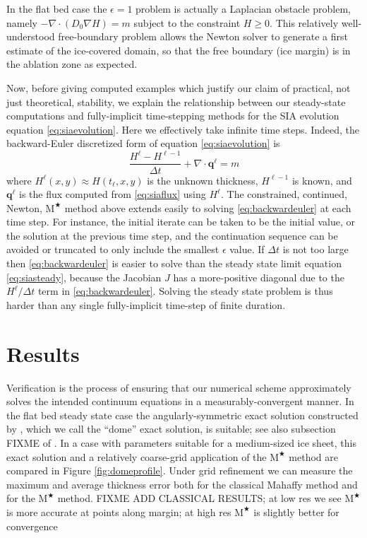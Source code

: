 \documentclass[twocolumn,letterpaper]{igs}
\newcommand\bq{\mathbf{q}}
\newcommand{\Div}{\nabla\cdot}
\newcommand\eps{\epsilon}
\newcommand{\grad}{\nabla}
\newcommand{\Mstar}{$\text{M}^{\bigstar}$\xspace}
\begin{document}
In the flat bed case the $\eps=1$ problem is actually a Laplacian obstacle problem, namely $-\Div(D_0 \grad H) = m$ subject to the constraint $H\ge 0$.  This relatively well-understood free-boundary problem \citep{KinderlehrerStampacchia1980} allows the Newton solver to generate a first estimate of the ice-covered domain, so that the free boundary (ice margin) is in the ablation zone as expected.

Now, before giving computed examples which justify our claim of practical, not just theoretical, stability, we explain the relationship between our steady-state computations and fully-implicit time-stepping methods for the SIA evolution equation \eqref{eq:siaevolution}.  Here we effectively take infinite time steps.  Indeed, the backward-Euler \citep{MortonMayers2005} discretized form of equation \eqref{eq:siaevolution} is
\begin{equation}
\frac{H^\ell - H^{\ell-1}}{\Delta t} + \Div \bq^\ell = m \label{eq:backwardeuler}
\end{equation}
where $H^\ell(x,y) \approx H(t_\ell,x,y)$ is the unknown thickness, $H^{\ell-1}$ is known, and $\bq^\ell$ is the flux computed from \eqref{eq:siaflux} using $H^\ell$.  The constrained, continued, Newton, \Mstar method above extends easily to solving \eqref{eq:backwardeuler} at each time step.  For instance, the initial iterate can be taken to be the initial value, or the solution at the previous time step, and the continuation sequence can be avoided or truncated to only include the smallest $\eps$ value.  If $\Delta t$ is not too large then \eqref{eq:backwardeuler} is easier to solve than the steady state limit equation \eqref{eq:siasteady}, because the Jacobian $J$ has a more-positive diagonal due to the $H^\ell/\Delta t$ term in \eqref{eq:backwardeuler}.  Solving the steady state problem is thus harder than any single fully-implicit time-step of finite duration.


\section{Results}

Verification is the process of ensuring that our numerical scheme approximately solves the intended continuum equations in a measurably-convergent manner.  In the flat bed steady state case the angularly-symmetric exact solution constructed by \cite{Bueler2003}, which we call the ``dome'' exact solution, is suitable; see also subsection FIXME of \cite{vanderVeen2013}.  In a case with parameters suitable for a medium-sized ice sheet, this exact solution and a relatively coarse-grid application of the \Mstar method are compared in Figure \ref{fig:domeprofile}.  Under grid refinement we can measure the maximum and average thickness error both for the classical Mahaffy method and for the \Mstar method.  FIXME ADD CLASSICAL RESULTS; at low res we see \Mstar is more accurate at points along margin; at high res \Mstar is slightly better for convergence
\end{document}
